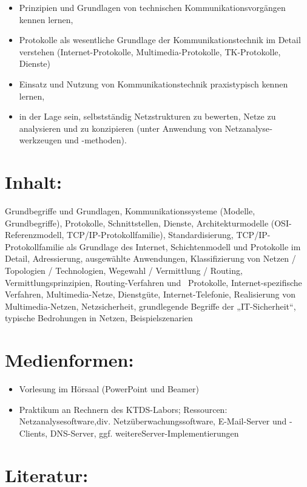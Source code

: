 \begin{itemize}
\item
  Prinzipien und Grundlagen von technischen Kommunikations­vor­gängen
  kennen lernen,
\item
  Protokolle als wesentliche Grundlage der Kommunikationstechnik im
  Detail verstehen (Internet-Protokolle, Multimedia-Protokolle,
  TK-Protokolle, Dienste)
\item
  Einsatz und Nutzung von Kommunikations­tech­nik praxistypisch kennen
  lernen,
\item
  in der Lage sein, selbstständig Netzstrukturen zu bewerten, Netze zu
  analysieren und zu konzipieren (unter Anwendung von
  Netz­analyse­werkzeugen und -methoden).
\end{itemize}

\section*{Inhalt:}\label{inhalt-12}

Grundbegriffe und Grundlagen, Kommunikationssysteme (Modelle,
Grundbegriffe), Protokolle, Schnittstellen, Dienste, Architekturmodelle
(OSI-Referenzmodell, TCP/IP-Protokollfamilie), Standardisierung,
TCP/IP-Protokollfamilie als Grundlage des Internet, Schichtenmodell und
Protokolle im Detail, Adressierung, ausgewählte Anwendungen,
Klassifizierung von Netzen / Topologien / Technologien, Wegewahl /
Vermittlung / Routing, Vermittlungsprinzipien, Routing-Verfahren und~
Protokolle, Internet-spezifische Verfahren, Multimedia-Netze,
Dienstgüte, Internet-Telefonie, Realisierung von Multimedia-Netzen,
Netzsicherheit, grundlegende Begriffe der „IT-Sicherheit``, typische
Bedrohungen in Netzen, Beispielszenarien

\section*{Medienformen:}\label{medienformen-5}

\begin{itemize}
\item
  Vorlesung im Hörsaal (PowerPoint und Beamer)
\item
  Praktikum an Rechnern des KTDS-Labors; Ressourcen:
  Netzanalysesoftware,div. Netzüberwachungssoftware, E-Mail-Server und
  -Clients, DNS-Server, ggf. weitereServer-Implementierungen
\end{itemize}

\section*{Literatur:}\label{literatur-9}

